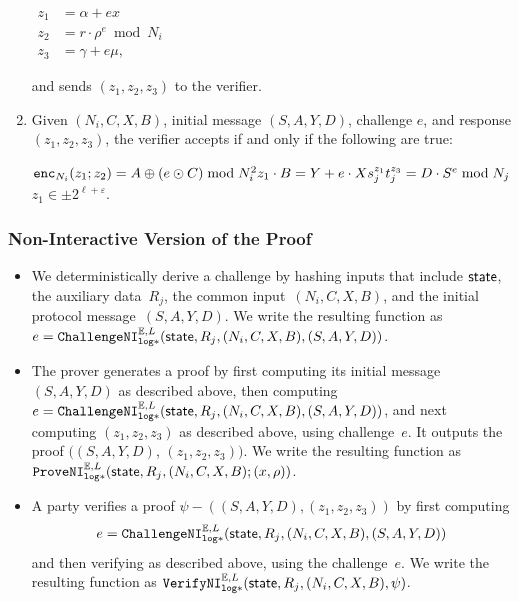 \documentclass[11pt]{article}
\def\state{{\sf state}}
\newcommand{\enc}{\ensuremath{\mathtt{enc}}}
\newcommand{\sid}{\ensuremath{\mathtt{sid}}}
\newcommand{\challengeni}[1]{\ensuremath{\mathtt{ChallengeNI}_{\mathtt{#1}}}}
\newcommand{\proveni}[1]{\ensuremath{\mathtt{ProveNI}_{\mathtt{#1}}}}
\newcommand{\verifyni}[1]{\ensuremath{\mathtt{VerifyNI}_{\mathtt{#1}}}}
\newcommand{\E}{\mathbb{E}}
\newcommand{\?}[1]{\stackrel{?}{#1}}
\begin{document}
\begin{enumerate}
    $\begin{aligned}
        z_1 &= \alpha + e x \\
        z_2 &= r \cdot \rho^e \bmod N_i \\
        z_3 &= \gamma + e \mu,
    \end{aligned}$
    
and sends $(z_1, z_2, z_3)$ to the verifier.

    \item Given $(N_i,C,X,B)$, initial message $(S,A,Y,D)$, challenge $e$, and response $(z_1,z_2,z_3)$, the verifier accepts if and only if the following are true:

    $\enc_{N_i}(z_1; z_2)  = A \oplus (e \odot C) \bmod N_i^2\\
    z_1 \cdot B = Y + e \cdot X \\
    s_j^{z_1} t_j^{z_3} = D \cdot S^e \bmod N_j$  \\
    $z_1 \in \pm 2^{\ell + \varepsilon}$.
\end{enumerate}

\subsubsection{Non-Interactive Version of the Proof}

\begin{itemize}
    \item We deterministically derive a challenge by hashing inputs that include $\state$, the auxiliary data~$R_j$, the common input~$(N_i,C,X, B)$, and the initial protocol message~$(S,A,Y,D)$.   
    We write the resulting function as 
    $e=\challengeni{log*}^{\E,L}(\state, R_j, (N_i,C,X, B), (S,A,Y,D))$.


    \item The prover generates a proof by first computing its initial message $(S, A, Y, D)$ as described above, then computing $e = \challengeni{log*}^{\E,L}(\state, R_j,(N_i,C,X, B), (S,A,Y,D))$, and next computing $(z_1,z_2,z_3)$ as described above, using challenge~$e$. It outputs the proof $((S, A, Y, D)$, $(z_1, z_2, z_3))$. We write the resulting function as $\proveni{log*}^{\E,L}(\state,R_j, (N_i, C, X, B); (x,\rho))$.

    \item A party verifies a proof $\psi-((S, A, Y, D), (z_1, z_2, z_3))$ by first computing \[e = \challengeni{log*}^{\E,L}(\state, R_j, (N_i,C,X, B), (S,A,Y,D))\] and then verifying as described above, using the challenge~$e$. We write the resulting function as $\verifyni{log*}^{\E,L}(\state, R_j, (N_i, C, X, B), \psi)$.
\end{itemize}
\end{document}
